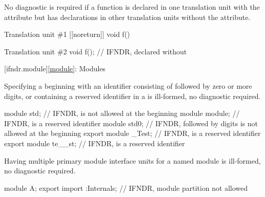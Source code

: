 
\pnum
No diagnostic is required if a function is declared
in one translation unit with the  attribute
but has declarations in other translation units
without the attribute.

\pnum
\begin{example}
\begin{codeblocktu}{Translation unit \#1}
[[noreturn]] void f() {}
\end{codeblocktu}
\begin{codeblocktu}{Translation unit \#2}
void f();           // IFNDR, declared without 
\end{codeblocktu}
\end{example}

[ifndr.module]{\ref*{module}: Modules}


\pnum
Specifying a 
beginning with an identifier
consisting of  followed by zero or more digits,
or containing a reserved identifier
in a 
is ill-formed, no diagnostic required.

\pnum
\begin{example}
\begin{codeblock}
module std;             // IFNDR,  is not allowed at the beginning
module module;          // IFNDR,  is a reserved identifier
module std0;            // IFNDR,  followed by digits is not allowed at the beginning
export module _Test;    // IFNDR,  is a reserved identifier
export module te__st;   // IFNDR,  is a reserved identifier
\end{codeblock}
\end{example}


\pnum
Having multiple primary module interface units
for a named module
is ill-formed, no diagnostic required.

\pnum
\begin{example}
\begin{codeblock}
module A;
export import :Internals;       // IFNDR, module partition not allowed
\end{codeblock}
\end{example}

